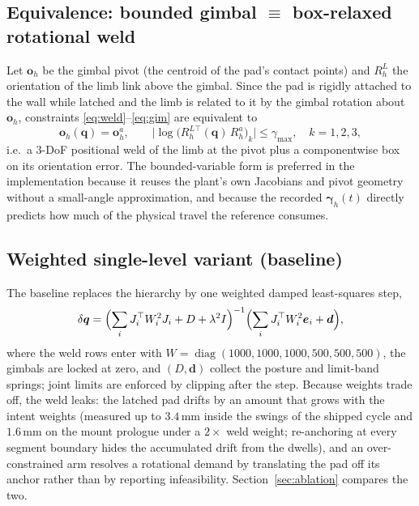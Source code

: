 \documentclass[11pt]{article}
\newcommand{\dq}{\delta\bm q}
\DeclareMathOperator{\diag}{diag}
\begin{document}
\subsection{Equivalence: bounded gimbal $\equiv$ box-relaxed rotational weld}

Let $\bm o_h$ be the gimbal pivot (the centroid of the pad's contact points)
and $R^{L}_h$ the orientation of the limb link above the gimbal. Since the pad
is rigidly attached to the wall while latched and the limb is related to it
by the gimbal rotation about $\bm o_h$, constraints
\eqref{eq:weld}--\eqref{eq:gim} are equivalent to
\begin{equation}
  \bm o_h(\bm q)=\bm o^a_h,\qquad
  \bigl|\log\!\bigl(R^{L\top}_h(\bm q)\,R^a_h\bigr)_k\bigr|\le\gamma_{\max},\quad k=1,2,3,
\end{equation}
i.e.\ a 3-DoF positional weld of the limb at the pivot plus a componentwise
box on its orientation error. The bounded-variable form is preferred in the
implementation because it reuses the plant's own Jacobians and pivot geometry
without a small-angle approximation, and because the recorded
$\bm\gamma_h(t)$ directly predicts how much of the physical travel the
reference consumes.

\subsection{Weighted single-level variant (baseline)}
\label{sec:weighted}

The baseline replaces the hierarchy by one weighted damped least-squares
step,
\begin{equation}
  \dq=\Bigl(\sum_i J_i^\top W_i^2J_i+D+\lambda^2 I\Bigr)^{-1}
      \Bigl(\sum_i J_i^\top W_i^2\bm e_i+\bm d\Bigr),
\end{equation}
where the weld rows enter with $W=\diag(1000,1000,1000,500,500,500)$, the
gimbals are locked at zero, and $(D,\bm d)$ collect the posture and
limit-band springs; joint limits are enforced by clipping after the step.
Because weights trade off, the weld leaks: the latched pad drifts by an
amount that grows with the intent weights (measured up to $3.4$\,mm inside
the swings of the shipped cycle and $1.6$\,mm on the mount prologue under a
$2\times$ weld weight; re-anchoring at every segment boundary hides the
accumulated drift from the dwells), and an over-constrained arm resolves a
rotational demand by translating the pad off its anchor rather than by
reporting infeasibility. Section~\ref{sec:ablation}
compares the two.
\end{document}
